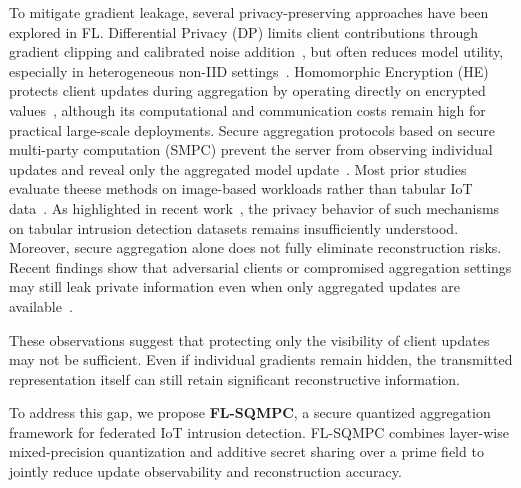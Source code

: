\documentclass[journal,twoside,web]{ieeecolor}
\begin{document}
To mitigate gradient leakage, several privacy-preserving approaches have been explored in FL. Differential Privacy (DP) limits client contributions through gradient clipping and calibrated noise addition~\cite{dwork2014dp,geyer2017dpfl}, but often reduces model utility, especially in heterogeneous non-IID settings~\cite{li2020convergence}. Homomorphic Encryption (HE) protects client updates during aggregation by operating directly on encrypted values~\cite{phong2018he,cheon2017ckks}, although its computational and communication costs remain high for practical large-scale deployments. Secure aggregation protocols based on secure multi-party computation (SMPC) prevent the server from observing individual updates and reveal only the aggregated model update~\cite{bonawitz2017secureagg}. Most prior studies evaluate theese methods on image-based workloads rather than tabular IoT data~\cite{zhang2022surveyGI}. As highlighted in recent work~\cite{vero2023tableak,houda2023mitfed}, the privacy behavior of such mechanisms on tabular intrusion detection datasets remains insufficiently understood. Moreover, secure aggregation alone does not fully eliminate reconstruction risks. Recent findings show that adversarial clients or compromised aggregation settings may still leak private information even when only aggregated updates are available~\cite{Sun2024ClientSideGIA}.

These observations suggest that protecting only the visibility of client updates may not be sufficient. Even if individual gradients remain hidden, the transmitted representation itself can still retain significant reconstructive information. 


To address this gap, we propose \textbf{FL-SQMPC}, a secure quantized aggregation framework for federated IoT intrusion detection. FL-SQMPC combines layer-wise mixed-precision quantization and additive secret sharing over a prime field to jointly reduce update observability and reconstruction accuracy. 
\end{document}
